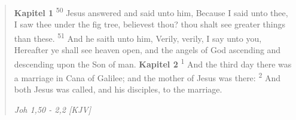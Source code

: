 \begin{quote}
\textbf{Kapitel 1}
\textsuperscript{50} Jesus answered and said unto him, Because I said unto thee, I saw thee under the fig tree, believest thou? thou shalt see greater things than these.
\textsuperscript{51} And he saith unto him, Verily, verily, I say unto you, Hereafter ye shall see heaven open, and the angels of God ascending and descending upon the Son of man.
\textbf{Kapitel 2}
\textsuperscript{1} And the third day there was a marriage in Cana of Galilee; and the mother of Jesus was there:
\textsuperscript{2} And both Jesus was called, and his disciples, to the marriage.
\begin{flushright}
\emph{Joh 1,50 - 2,2 [KJV]}
\end{flushright}
\end{quote}